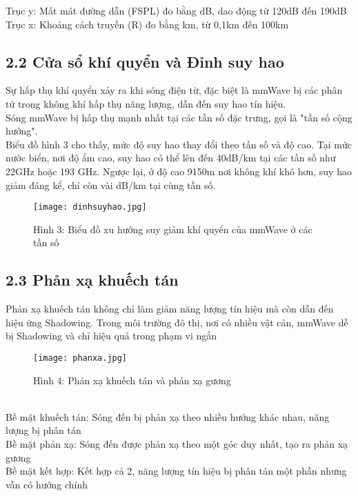 \documentclass[a4paper,13pt]{article}
\begin{document}
Trục y: Mất mát đường dẫn (FSPL) đo bằng dB, dao động từ 120dB đến 190dB\\

Trục x: Khoảng cách truyền (R) đo bằng km, từ 0,1km đến 100km

\subsection{2.2 Cửa sổ khí quyển và Đỉnh suy hao}
Sự hấp thụ khí quyển xảy ra khi sóng điện từ, đặc biệt là mmWave bị các phân tử trong không khí hấp thụ năng lượng, dẫn đến suy hao tín hiệu. \\
Sóng mmWave bị hấp thụ mạnh nhất tại các tần số đặc trưng, gọi là "tần số cộng hưởng". \\
Biểu đồ hình 3 cho thấy, mức độ suy hao thay đổi theo tần số và độ cao. Tại mức nước biển, nơi độ ẩm cao, suy hao có thể lên đến 40dB/km tại các tần số như 22GHz hoặc 193 GHz. Ngược lại, ở độ cao 9150m nơi không khí khô hơn, suy hao giảm đáng kể, chỉ còn vài dB/km tại cùng tần số.
\begin{figure}[htbp]
    \centering
    \texttt{[image: dinhsuyhao.jpg]}
    \caption*{Hình 3: Biểu đồ xu hướng suy giảm khí quyển của mmWave ở các tần số \cite{key2} }
    \label{fig:model}
\end{figure}

\subsection{2.3 Phản xạ khuếch tán}
Phản xạ khuếch tán không chỉ làm giảm năng lượng tín hiệu mà còn dẫn đến hiệu ứng Shadowing. Trong môi trường đô thị, nơi có nhiều vật cản, mmWave dễ bị Shadowing và chỉ hiệu quả trong phạm vi ngắn
\begin{figure}[htbp]
    \centering
    \texttt{[image: phanxa.jpg]}
    \caption*{Hình 4: Phản xạ khuếch tán và phản xạ gương \cite{key2} }
    \label{fig:model}
\end{figure} \\
Bề mặt khuếch tán: Sóng đến bị phản xạ theo nhiều hướng khác nhau, năng lượng bị phân tán \\
Bề mặt phản xạ: Sóng đến được phản xạ theo một góc duy nhất, tạo ra phản xạ gương \\
Bề mặt kết hợp: Kết hợp cả 2, năng lượng tín hiệu bị phân tán một phần nhưng vẫn có hướng chính\\
\end{document}
